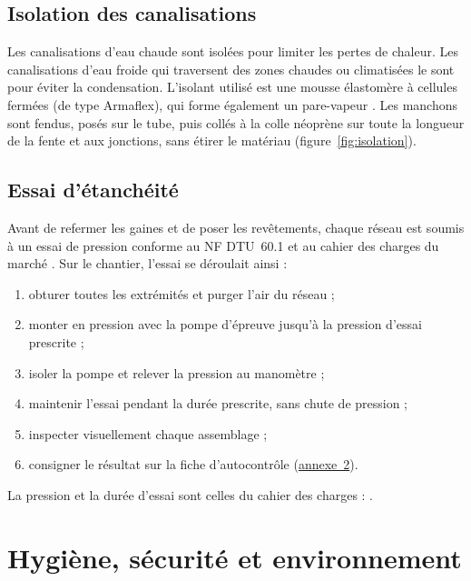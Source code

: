 
\subsection{Isolation des canalisations}
Les canalisations d'eau chaude sont isolées pour limiter les pertes de chaleur. Les
canalisations d'eau froide qui traversent des zones chaudes ou climatisées le sont pour éviter
la condensation. L'isolant utilisé est une mousse élastomère à cellules fermées (de type
Armaflex), qui forme également un pare-vapeur \cite{armacell}. Les manchons sont fendus,
posés sur le tube, puis collés à la colle néoprène sur toute la longueur de la fente et aux
jonctions, sans étirer le matériau (figure~\ref{fig:isolation}).


\subsection{Essai d'étanchéité}
Avant de refermer les gaines et de poser les revêtements, chaque réseau est soumis à un essai
de pression conforme au NF DTU~60.1 et au cahier des charges du marché \cite{dtu601,ffbEssais}.
Sur le chantier, l'essai se déroulait ainsi :
\begin{enumerate}
  \item obturer toutes les extrémités et purger l'air du réseau ;
  \item monter en pression avec la pompe d'épreuve jusqu'à la pression d'essai prescrite ;
  \item isoler la pompe et relever la pression au manomètre ;
  \item maintenir l'essai pendant la durée prescrite, sans chute de pression ;
  \item inspecter visuellement chaque assemblage ;
  \item consigner le résultat sur la fiche d'autocontrôle (\hyperref[ann:fiche]{annexe~2}).
\end{enumerate}
La pression et la durée d'essai sont celles du cahier des charges : .

\section{Hygiène, sécurité et environnement}

